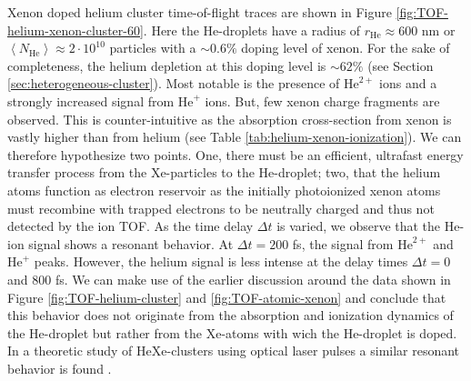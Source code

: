 Xenon doped helium cluster time-of-flight traces are shown in Figure \ref{fig:TOF-helium-xenon-cluster-60}. Here the He-droplets have a radius of $r_{\text{He}}\approx 600$ nm or $\left\langle N_{\text{He}}\right\rangle\approx 2\cdot 10^{10}$ particles with a $\sim 0.6\%$ doping level of xenon. For the sake of completeness, the helium depletion at this doping level is $\sim 62\%$ (see Section \ref{sec:heterogeneous-cluster}). Most notable is the presence of $\text{He}^{2+}$ ions and a strongly increased signal from $\text{He}^{+}$ ions. But, few xenon charge fragments are observed. This is counter-intuitive as the absorption cross-section from xenon is vastly higher than from helium (see Table \ref{tab:helium-xenon-ionization}). We can therefore hypothesize two points. One, there must be an efficient, ultrafast energy transfer process from the Xe-particles to the He-droplet; two, that the helium atoms function as electron reservoir as the initially photoionized xenon atoms must recombine with trapped electrons to be neutrally charged and thus not detected by the ion TOF. As the time delay $\Delta t$ is varied, we observe that the He-ion signal shows a resonant behavior. At $\Delta t = 200$ fs, the signal from $\text{He}^{2+}$ and $\text{He}^{+}$ peaks. However, the helium signal is less intense at the delay times $\Delta t = 0$ and 800 fs. We can make use of the earlier discussion around the data shown in Figure \ref{fig:TOF-helium-cluster} and \ref{fig:TOF-atomic-xenon} and conclude that this behavior does not originate from the absorption and ionization dynamics of the He-droplet but rather from the Xe-atoms with wich the He-droplet is doped. In a theoretic study of HeXe-clusters using optical laser pulses a similar resonant behavior is found \citep{Mikaberidze-2008-PRA}.\\[1\baselineskip]
